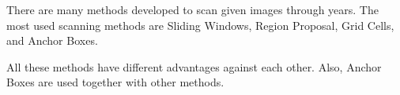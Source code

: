 \documentclass{article}
\begin{document}
\setlength{\parindent}{6ex}
\indent

There are many methods developed to scan given images through years.
The most used scanning methods are Sliding Windows, Region Proposal, 
Grid Cells, and Anchor Boxes. \par

All these methods have different advantages against each other. Also, 
Anchor Boxes are used together with other methods.
\end{document}

